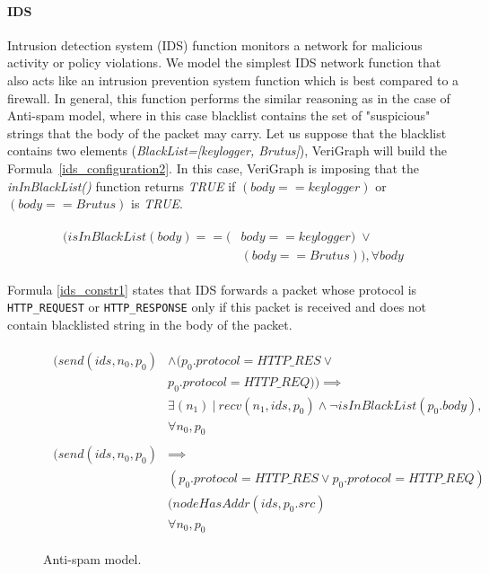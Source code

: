 \paragraph{IDS}
Intrusion detection system (IDS) function monitors a network for malicious activity or policy violations. We model the simplest IDS network function that also acts like an intrusion prevention system function which is best compared to a firewall. In general, this function performs the similar reasoning as in the case of Anti-spam model, where in this case blacklist contains the set of "suspicious" strings that the body of the packet may carry. Let us suppose that the blacklist contains two elements (\textit{BlackList=[keylogger, Brutus]}), VeriGraph will build the Formula~\ref{ids_configuration2}. In this case, VeriGraph is imposing that the \textit{inInBlackList()} function returns \textit{TRUE} if \textit{$(body == keylogger)$} or \textit{$(body == Brutus)$} is \textit{TRUE}. 

\begin{figure}[h]
		{\footnotesize
			\begin{subequations}
				\begin{align}
					\begin{split}
						\label{ids_configuration2}
						(isInBlackList(body) == (& body == keylogger) \; \vee \\
						& (body == Brutus)), \forall body
					\end{split}
				\end{align}
			\end{subequations}
		}%
\end{figure}


Formula \ref{ids_constr1} states that IDS forwards a packet whose protocol is \texttt{HTTP\_REQUEST} or \texttt{HTTP\_RESPONSE} only if this packet is received and does not contain blacklisted string in the body of the packet.
\begin{figure}[h]
	{\footnotesize
		\begin{subequations}
			\begin{align}
				\begin{split}
					\label{ids_constr1}
					(send(ids, n_{0}, p_{0}) & \wedge (p_{0}.protocol = HTTP\_RES \vee \\
					& p_{0}.protocol = HTTP\_REQ)) \implies \\
					& \exists (n_{1}) \: | \:  recv(n_{1}, ids, p_{0}) \wedge \neg isInBlackList(p_{0}.body), \\
					& \forall n_{0}, p_{0}
				\end{split} \\
				\begin{split}
					\label{ids_constr2}
					(send(ids, n_{0}, p_{0})& \implies  \\
					& (p_{0}.protocol = HTTP\_RES \vee  p_{0}.protocol = HTTP\_REQ) \\ 
					& (nodeHasAddr(ids, p_{0}.src) \\
					& \forall n_{0}, p_{0}
				\end{split}
			\end{align}
		\end{subequations}
	}%
	\caption{Anti-spam model.}
	\label{anti-spam_model}
\end{figure}

